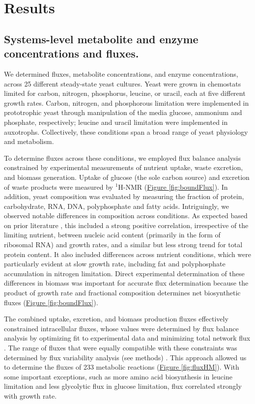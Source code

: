\section{Results}

\subsection{Systems-level metabolite and enzyme concentrations and fluxes.}

We determined fluxes, metabolite concentrations, and enzyme concentrations, across 25 different steady-state yeast cultures. Yeast were grown in chemostats limited for carbon, nitrogen, phosphorus, leucine, or uracil, each at five different growth rates. Carbon, nitrogen, and phosphorous limitation were implemented in prototrophic yeast through manipulation of the media glucose, ammonium and phosphate, respectively; leucine and uracil limitation were implemented in auxotrophs. Collectively, these conditions span a broad range of yeast physiology and metabolism.

To determine fluxes across these conditions, we employed flux balance analysis constrained by experimental measurements of nutrient uptake, waste excretion, and biomass generation. Uptake of glucose (the sole carbon source) and excretion of waste products were measured by $^{1}$H-NMR (\hyperref[fig:boundFlux]{Figure \ref{fig:boundFlux}}). In addition, yeast composition was evaluated by measuring the fraction of protein, carbohydrate, RNA, DNA, polyphosphate and fatty acids. Intriguingly, we observed notable differences in composition across conditions. As expected based on prior literature \cite{Schulze:1995uv, Lange:2001th}, this included a strong positive correlation, irrespective of the limiting nutrient, between nucleic acid content (primarily in the form of ribosomal RNA) and growth rates, and a similar but less strong trend for total protein content. It also included differences across nutrient conditions, which were particularly evident at slow growth rate, including fat and polyphosphate accumulation in nitrogen limitation. Direct experimental determination of these differences in biomass was important for accurate flux determination because the product of growth rate and fractional composition determines net biosynthetic fluxes (\hyperref[fig:boundFlux]{Figure \ref{fig:boundFlux}}).

The combined uptake, excretion, and biomass production fluxes effectively constrained intracellular fluxes, whose values were determined by flux balance analysis by optimizing fit to experimental data and minimizing total network flux \cite{Herrgard:2008gb, Yizhak:2010jk}. The range of fluxes that were equally compatible with these constraints was determined by flux variability analysis (see methods) \cite{Mahadevan:2003wq}. This approach allowed us to determine the fluxes of 233 metabolic reactions (\hyperref[fig:fluxHM]{Figure \ref{fig:fluxHM}}). With some important exceptions, such as more amino acid biosynthesis in leucine limitation and less glycolytic flux in glucose limitation, flux correlated strongly with growth rate.

